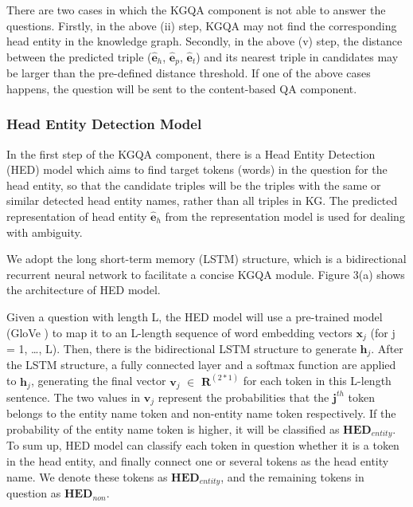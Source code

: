 \documentclass[11pt]{article}
\begin{document}
There are two cases in which the KGQA component is not able to answer the questions. Firstly, in the above (ii) step, KGQA may not find the corresponding head entity in the knowledge graph. Secondly, in the above (v) step, the distance between the predicted triple ($\hat{\mathbf{e}}_{h}$, $\hat{\mathbf{e}}_{p}$, $\hat{\mathbf{e}}_{t}$) and its nearest triple in candidates may be larger than the pre-defined distance threshold. If one of the above cases happens, the question will be sent to the content-based QA component.



\subsubsection{Head Entity Detection Model}\label{sec:Head Entity Detection Model}
In the first step of the KGQA component, there is a Head Entity Detection (HED) model which aims to find target tokens (words) in the question for the head entity, so that the candidate triples will be the triples with the same or similar detected head entity names, rather than all triples in KG. The predicted representation of head entity $\hat{\mathbf{e}}_h$ from the representation model is used for dealing with ambiguity.

We adopt the long short-term memory (LSTM) \cite{c20} structure, which is a bidirectional recurrent neural network to facilitate a concise KGQA module. Figure 3(a) shows the architecture of HED model.


Given a question with length L, the HED model will use a pre-trained model (GloVe \cite{c21}) to map it to an L-length sequence of word embedding vectors $\mathbf{x}_j$ (for j = 1, …, L). Then, there is the bidirectional LSTM \cite{c20} structure to generate $\mathbf{h}_j$. After the LSTM structure, a fully connected layer and a softmax function are applied to $\mathbf{h}_j$, generating the final vector $\mathbf{v}_j$ $\in$ $\mathbf{R}^{(2*1)}$ for each token in this L-length sentence. The two values in $\mathbf{v}_j$ represent the probabilities that the $\mathbf{j}^{th}$ token belongs to the entity name token and non-entity name token respectively. If the probability of the entity name token is higher, it will be classified as ${\mathbf{HED}}_{entity}$. To sum up, HED model can classify each token in question whether it is a token in the head entity, and finally connect one or several tokens as the head entity name. We denote these tokens as ${\mathbf{HED}}_{entity}$, and the remaining tokens in question as ${\mathbf{HED}}_{non}$.
\end{document}
